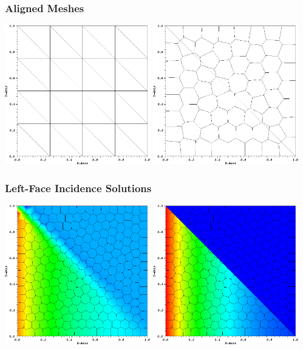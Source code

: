 \documentclass[compress,10pt]{beamer}
\begin{document}
\begin{frame}[t]
{}
{
\frametitle{Aligned Meshes}
\vspace{0.75cm}
\hspace*{0.25cm}
{}\includegraphics[width=0.475\textwidth]{images/PAMesh_Tri.png} 
{}\includegraphics[width=0.475\textwidth]{images/PAMesh_SplitPoly.png}
}
{
\frametitle{Left-Face Incidence Solutions}
\vspace{0.75cm}
\hspace*{0.25cm}
{}\includegraphics[width=0.475\textwidth]{images/PALeftSol_Poly.png} 
{}\includegraphics[width=0.475\textwidth]{images/PALeftSol_SplitPoly.png}
}
\end{frame}
\end{document}
